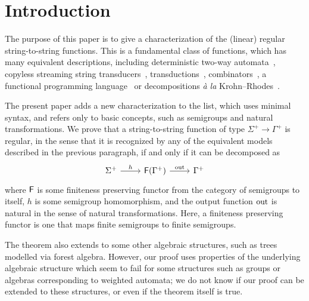 \section{Introduction}
\label{sec:intro}

The purpose of this paper is to give a characterization of the (linear) regular string-to-string functions. This is a fundamental class of functions, which has many equivalent descriptions, including deterministic two-way automata~\cite[Note~4]{shepherdson1959reduction}, copyless streaming string transducers~\cite[Section~3]{alurExpressivenessStreamingString2010}, \mso transductions~\cite[Theorem~13]{engelfrietMSODefinableString2001}, combinators~\cite[Section~2]{alur2014regular}, a functional programming language~\cite[Section~6]{bojanczykRegularFirstOrderList2018} or decompositions \textit{à la} Krohn--Rhodes~\cite[Theorem~18, item~4]{bojanczykstefanski2020}. 


The present paper adds a new characterization to the list, which uses minimal syntax, and refers only to basic concepts, such as semigroups and natural transformations. We prove that a string-to-string function of type $\Sigma^+ \to \Gamma^+$ is regular, in the sense that it is recognized by any of the equivalent models described in the previous paragraph, if and only if it can be decomposed as 
\[
\begin{tikzcd}
    \Sigma^+ 
    \ar[r,"h"]
    & 
    \functor(\Gamma^+)
    \ar[r,"\outfun"]
    &
    \Gamma^+
\end{tikzcd}
\]
where $\mathsf F$ is some finiteness preserving functor from the category of semigroups to itself, $h$ is some semigroup homomorphism, and the output function $\mathrm{out}$ is natural in the sense of natural transformations. Here, a finiteness preserving functor is one that maps finite semigroups to finite semigroups. 


The theorem also extends to some other algebraic structures, such as trees modelled via forest algebra. However, our proof uses properties of the underlying algebraic structure which seem to fail for some structures such as groups or algebras corresponding to weighted automata; we do not know if our proof can be extended to  these structures, or even if the theorem itself is true.

